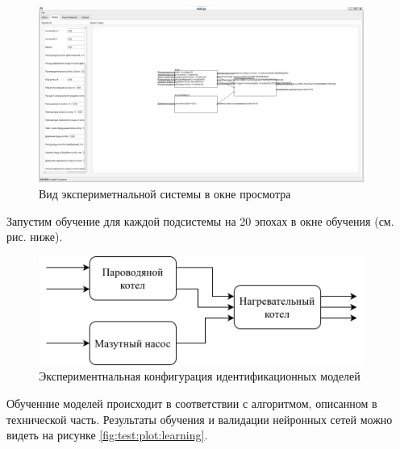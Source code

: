 \begin{figure}[H]
  \begin{center}
    \includegraphics[width=0.95\textwidth]{figures/modules/modelling.png}
  \end{center}
  \caption{Вид экспериметнальной системы в окне
  просмотра}\label{fig:test:preview}
\end{figure}

Запустим обучение для каждой подсистемы на 20 эпохах в окне обучения (см. рис.
ниже). 

\begin{figure}[H]
  \begin{center}
    \includegraphics[width=0.95\textwidth]{figures/subsystem_diagram.png}
  \end{center}
  \caption{Экспериментнальная конфигурация идентификационных
  моделей}\label{fig:test:neural_form}
\end{figure}

Обученние моделей происходит в соответствии с алгоритмом, описанном в
технической часть. Результаты обучения и валидации нейронных сетей можно видеть
на рисунке \ref{fig:test:plot:learning}.

